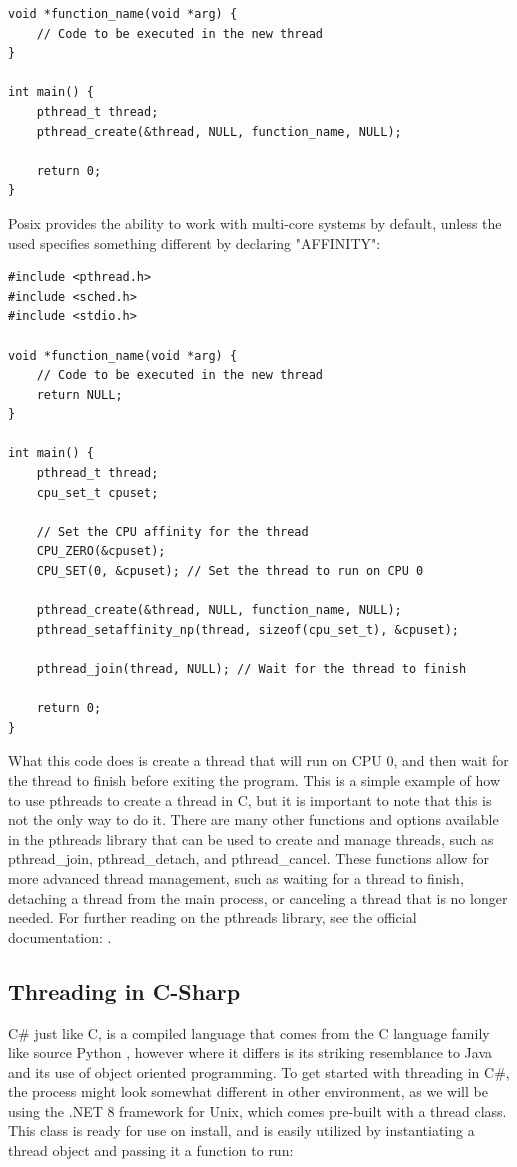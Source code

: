 \documentclass[12pt,a4paper]{article}
\begin{document}
\begin{verbatim}
void *function_name(void *arg) {
    // Code to be executed in the new thread
}

int main() {
    pthread_t thread;
    pthread_create(&thread, NULL, function_name, NULL);

    return 0;
}
\end{verbatim}

Posix provides the ability to work with multi-core systems by default, unless the used specifies something different by declaring "AFFINITY":

\begin{verbatim}
#include <pthread.h>
#include <sched.h>
#include <stdio.h>

void *function_name(void *arg) {
    // Code to be executed in the new thread
    return NULL;
}

int main() {
    pthread_t thread;
    cpu_set_t cpuset;

    // Set the CPU affinity for the thread
    CPU_ZERO(&cpuset);
    CPU_SET(0, &cpuset); // Set the thread to run on CPU 0

    pthread_create(&thread, NULL, function_name, NULL);
    pthread_setaffinity_np(thread, sizeof(cpu_set_t), &cpuset);

    pthread_join(thread, NULL); // Wait for the thread to finish

    return 0;
}
\end{verbatim}

What this code does is create a thread that will run on CPU 0, and then wait for the thread to finish before exiting the program. This is a simple example of how to use pthreads to create a thread in C, but it is important to note that this is not the only way to do it. There are many other functions and options available in the pthreads library that can be used to create and manage threads, such as pthread\_join, pthread\_detach, and pthread\_cancel. These functions allow for more advanced thread management, such as waiting for a thread to finish, detaching a thread from the main process, or canceling a thread that is no longer needed. For further reading on the pthreads library, see the official documentation: .

\subsection{Threading in C-Sharp}

C\# just like C, is a compiled language that comes from the C language family like source Python \parencite{PythonFAQ}, however where it differs is its striking resemblance to Java and its use of object oriented programming. To get started with threading in C\#, the process might look somewhat different in other environment, as we will be using the .NET 8 framework for Unix, which comes pre-built with a thread class. This class is ready for use on install, and is easily utilized by instantiating a thread object\parencite{CSThreadClass} and passing it a function to run:
\end{document}
